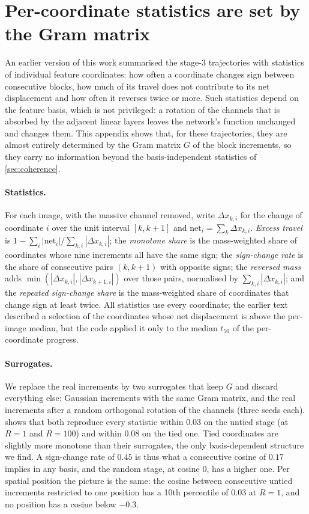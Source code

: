 \section{Per-coordinate statistics are set by the Gram matrix}
\label{app:per-coordinate}

An earlier version of this work summarised the stage-3 trajectories with statistics of
individual feature coordinates: how often a coordinate changes sign between consecutive
blocks, how much of its travel does not contribute to its net displacement and how
often it reverses twice or more.
Such statistics depend on the feature basis, which is not privileged: a rotation of the
channels that is absorbed by the adjacent linear layers leaves the network's function
unchanged and changes them.
This appendix shows that, for these trajectories, they are almost entirely determined
by the Gram matrix $G$ of the block increments, so they carry no information beyond the
basis-independent statistics of \cref{sec:coherence}.

\paragraph{Statistics.}
For each image, with the massive channel removed, write $\Delta x_{k,i}$ for the change
of coordinate $i$ over the unit interval $[k,k{+}1]$ and
$\mathrm{net}_i=\sum_k\Delta x_{k,i}$.
\emph{Excess travel} is $1-\sum_i|\mathrm{net}_i|/\sum_{k,i}|\Delta x_{k,i}|$;
the \emph{monotone share} is the mass-weighted share of coordinates whose nine
increments all have the same sign;
the \emph{sign-change rate} is the share of consecutive pairs $(k,k{+}1)$ with opposite
signs;
the \emph{reversed mass} adds $\min(|\Delta x_{k,i}|,|\Delta x_{k+1,i}|)$ over those
pairs, normalised by $\sum_{k,i}|\Delta x_{k,i}|$;
and the \emph{repeated sign-change share} is the mass-weighted share of coordinates that
change sign at least twice.
All statistics use every coordinate; the earlier text described a selection of the
coordinates whose net displacement is above the per-image median, but the code applied
it only to the median $t_{50}$ of the per-coordinate progress.

\paragraph{Surrogates.}
We replace the real increments by two surrogates that keep $G$ and discard everything
else: Gaussian increments with the same Gram matrix, and the real increments after a
random orthogonal rotation of the channels (three seeds each).
 shows that both reproduce every statistic within $0.03$
on the untied stage (at $R{=}1$ and $R{=}100$) and within $0.08$ on the tied one.
Tied coordinates are slightly more monotone than their surrogates, the only
basis-dependent structure we find.
A sign-change rate of $0.45$ is thus what a consecutive cosine of $0.17$ implies in any
basis, and the random stage, at cosine $0$, has a higher one.
Per spatial position the picture is the same: the cosine between consecutive untied
increments restricted to one position has a 10th percentile of $0.03$ at $R{=}1$, and
no position has a cosine below $-0.3$.

